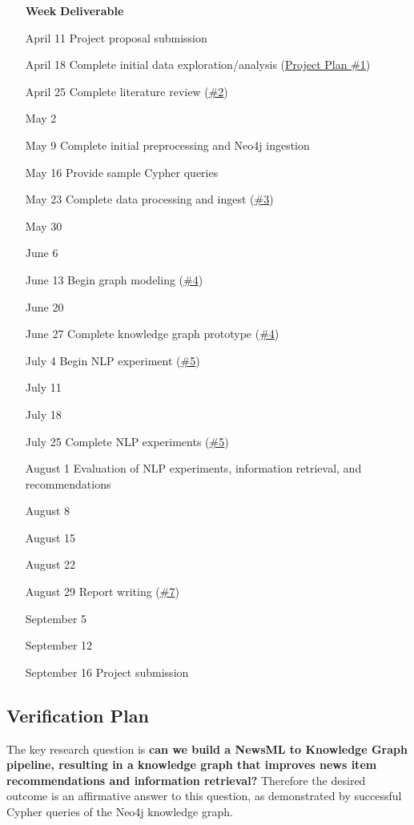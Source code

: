\documentclass[11pt]{article}
\begin{document}
\begin{itemize}
\item [\textbf{Week}] \textbf{Deliverable}
\item [April 11] Project proposal submission
\item [April 18] Complete initial data exploration/analysis (\hyperref[sec:PropDataExploration]{Project Plan \#1})
\item [April 25] Complete literature review (\hyperref[sec:PropLiteratureReview]{\#2})

\item [May 2]
\item [May 9] Complete initial preprocessing and Neo4j ingestion
\item [May 16] Provide sample Cypher queries
\item [May 23] Complete data processing and ingest (\hyperref[sec:PropDataProcessing]{\#3})
\item [May 30]

\item [June 6]
\item [June 13] Begin graph modeling (\hyperref[sec:PropGraphModeling]{\#4})
\item [June 20]
\item [June 27] Complete knowledge graph prototype (\hyperref[sec:PropGraphModeling]{\#4})

\item [July 4] Begin NLP experiment (\hyperref[sec:PropNLP]{\#5})
\item [July 11]
\item [July 18]
\item [July 25] Complete NLP experiments (\hyperref[sec:PropNLP]{\#5})

\item [August 1] Evaluation of NLP experiments, information retrieval, and recommendations
\item [August 8]
\item [August 15]
\item [August 22]
\item [August 29] Report writing (\hyperref[sec:PropWrittenReport]{\#7})

\item [September 5]
\item [September 12]
\item [September 16] Project submission
\end{itemize}

\subsection{Verification Plan}
The key research question is \textbf{can we build a NewsML to Knowledge Graph pipeline, resulting in a knowledge graph that improves news item recommendations and information retrieval?} Therefore the desired outcome is an affirmative answer to this question, as demonstrated by successful Cypher queries of the Neo4j knowledge graph.
\end{document}
